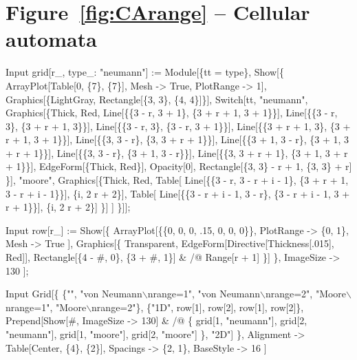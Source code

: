 \documentclass[11pt,fleqn]{book} %
\begin{document}
\section*{Figure~\ref{fig:CArange} -- Cellular automata }
\small{
\begin{mmaCell}[index=1]{Input}
  grid[r_, type_: "neumann"] := Module[\{tt = type\},
    Show[\{
      ArrayPlot[Table[0, \{7\}, \{7\}], Mesh -> True, PlotRange -> 1],
      Graphics[\{LightGray, Rectangle[\{3, 3\}, \{4, 4\}]\}],
        Switch[tt, "neumann",
          Graphics[\{Thick, Red, Line[\{\{3 - r, 3 + 1\}, \{3 + r + 1, 3 + 1\}\}],
            Line[\{\{3 - r, 3\}, \{3 + r + 1, 3\}\}],
            Line[\{\{3 - r, 3\}, \{3 - r, 3 + 1\}\}],
            Line[\{\{3 + r + 1, 3\}, \{3 + r + 1, 3 + 1\}\}],
            Line[\{\{3, 3 - r\}, \{3, 3 + r + 1\}\}],
            Line[\{\{3 + 1, 3 - r\}, \{3 + 1, 3 + r + 1\}\}],
            Line[\{\{3, 3 - r\}, \{3 + 1, 3 - r\}\}],
            Line[\{\{3, 3 + r + 1\}, \{3 + 1, 3 + r + 1\}\}],
            EdgeForm[\{Thick, Red\}], Opacity[0],
            Rectangle[\{3, 3\} - r + 1, \{3, 3\} + r]
          \}],
          "moore",
          Graphics[\{Thick, Red,
          Table[
            Line[\{\{3 - r, 3 - r + i - 1\}, \{3 + r + 1, 3 - r + i - 1\}\}],
            \{i, 2 r + 2\}],
          Table[
            Line[\{\{3 - r + i - 1, 3 - r\}, \{3 - r + i - 1, 3 + r + 1\}\}],
            \{i, 2 r + 2\}]
          \}]
        ]
      \}]];
\end{mmaCell}

\begin{mmaCell}{Input}      
  row[r_] := Show[\{
    ArrayPlot[\{\{0, 0, 0, .15, 0, 0, 0\}\}, 
      PlotRange -> \{0, 1\}, Mesh -> True
    ],
    Graphics[\{
      Transparent, EdgeForm[Directive[Thickness[.015], Red]],
      Rectangle[\{4 - #, 0\}, \{3 + #, 1\}] & /@ Range[r + 1]
    \}]
    \}, ImageSize -> 130
    ];
\end{mmaCell}
\begin{mmaCell}{Input}    
  Grid[\{
    \{"", "von Neumann\(\backslash\)nrange=1", "von Neumann\(\backslash\)nrange=2", 
    "Moore\(\backslash\)nrange=1", "Moore\(\backslash\)nrange=2"\}, 
    \{"1D", row[1], row[2], row[1], row[2]\}, 
    Prepend[Show[#, ImageSize -> 130] & /@ \{
      grid[1, "neumann"], grid[2, "neumann"], grid[1, "moore"], grid[2, "moore"]
      \}, "2D"]
    \},
    Alignment -> Table[Center, \{4\}, \{2\}], 
    Spacings  -> \{2, 1\}, 
    BaseStyle -> 16
  ]
\end{mmaCell}
}
\end{document}
